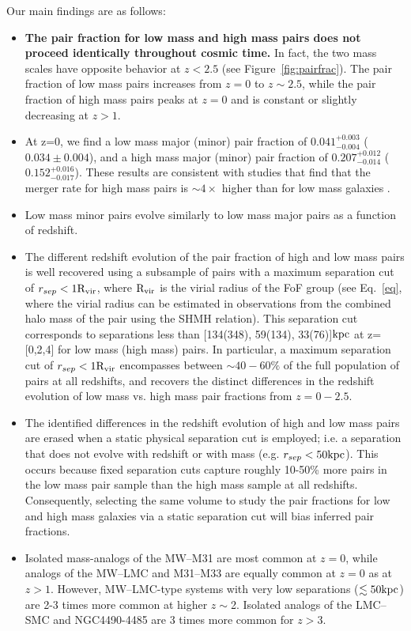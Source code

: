 \documentclass[twocolumn]{aastex631}
\newcommand{\Rvir}{\ensuremath{\rm R_{vir}}}
\begin{document}
Our main findings are as follows:
\begin{itemize}
    \item \textbf{The pair fraction for low mass and high mass pairs does not proceed identically throughout cosmic time.}
    In fact, the two mass scales have opposite behavior at $z<2.5$ (see Figure~\ref{fig:pairfrac}).
    The pair fraction of low mass pairs increases from $z=0$ to $z\sim2.5$, while the pair fraction of high mass pairs peaks at $z=0$ and is constant or slightly decreasing at $z>1$.
    \item At z=0, we find a low mass major (minor) pair fraction of $0.041^{+0.003}_{-0.004}$ ($0.034\pm0.004$), and a high mass major (minor) pair fraction of $0.207^{+0.012}_{-0.014}$ ($0.152^{+0.016}_{-0.017}$). 
    These results are consistent with studies that find that the merger rate for high mass pairs is $\sim4\times$ higher than for low mass galaxies \citep[e.g.][]{RG2015}. 
    \item Low mass minor pairs evolve similarly to low mass major pairs as a function of redshift.
    \item The different redshift evolution of the pair fraction of high and low mass pairs is well recovered using a subsample of pairs with a maximum separation cut of $r_{sep}<1\Rvir$, where $\Rvir$ is the virial radius of the FoF group (see Eq.~\ref{eq}, where the virial radius can be estimated in observations from the combined halo mass of the pair using the SHMH relation).
    This separation cut corresponds to separations less than [134(348), 59(134), 33(76)]$\mathrm{kpc}$ at z=[0,2,4] for low mass (high mass) pairs.
    In particular, a maximum separation cut of $r_{sep}<1\Rvir$ encompasses between $\sim40-60\%$ of the full population of pairs at all redshifts, and recovers the distinct differences in the redshift evolution of low mass vs. high mass pair fractions from $z=0-2.5$. 
    \item The identified differences in the redshift evolution of high and low mass pairs are erased when a static physical separation cut is employed; i.e. a separation that does not evolve with redshift or with mass (e.g. $r_{sep}<50\mathrm{kpc}$). 
    This occurs because fixed separation cuts capture roughly 10-50\% more pairs in the low mass pair sample than the high mass sample at all redshifts.  
    Consequently, selecting the same volume to study the pair fractions for low and high mass galaxies via a static separation cut will bias inferred pair fractions. 
    \item Isolated mass-analogs of the MW--M31 are most common at $z=0$, while analogs of the MW--LMC and M31--M33 are equally common at $z=0$ as at $z>1$. 
    However, MW--LMC-type systems with very low separations ($\lesssim50\mathrm{kpc}$) are 2-3 times more common at higher $z\sim$2. 
    Isolated analogs of the LMC--SMC and  NGC4490-4485 are 3 times more common for $z>3$. 
\end{itemize}
    
\end{document}
